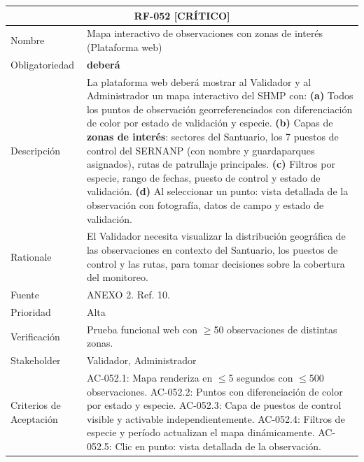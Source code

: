 \documentclass[12pt, a4paper]{article}
\newcommand{\criticomark}{\textcolor{criticolor}{\textbf{[CR\'ITICO]}}}
\begin{document}
\begin{longtable}{|p{3cm}|p{11.5cm}|}
\hline
\multicolumn{2}{|c|}{\textbf{RF-052} \criticomark} \\
\hline
Nombre & Mapa interactivo de observaciones con zonas de inter\'es (Plataforma web) \\
\hline
Obligatoriedad & \textbf{deber\'a} \\
\hline
Descripci\'on & La plataforma web deber\'a mostrar al Validador y al Administrador un mapa interactivo del SHMP con:\newline
\textbf{(a)} Todos los puntos de observaci\'on georreferenciados con diferenciaci\'on de color por estado de validaci\'on y especie.\newline
\textbf{(b)} Capas de \textbf{zonas de inter\'es}: sectores del Santuario, los 7 puestos de control del SERNANP (con nombre y guardaparques asignados), rutas de patrullaje principales.\newline
\textbf{(c)} Filtros por especie, rango de fechas, puesto de control y estado de validaci\'on.\newline
\textbf{(d)} Al seleccionar un punto: vista detallada de la observaci\'on con fotograf\'ia, datos de campo y estado de validaci\'on. \\
\hline
Rationale & El Validador necesita visualizar la distribuci\'on geogr\'afica de las observaciones en contexto del Santuario, los puestos de control y las rutas, para tomar decisiones sobre la cobertura del monitoreo. \\
\hline
Fuente & ANEXO 2. Ref. 10. \\
\hline
Prioridad & Alta \\
\hline
Verificaci\'on & Prueba funcional web con $\geq$50 observaciones de distintas zonas. \\
\hline
Stakeholder & Validador, Administrador \\
\hline
Criterios de Aceptaci\'on &
AC-052.1: Mapa renderiza en $\leq$5 segundos con $\leq$500 observaciones. \newline
AC-052.2: Puntos con diferenciaci\'on de color por estado y especie. \newline
AC-052.3: Capa de puestos de control visible y activable independientemente. \newline
AC-052.4: Filtros de especie y per\'iodo actualizan el mapa din\'amicamente. \newline
AC-052.5: Clic en punto: vista detallada de la observaci\'on. \\
\hline
\end{longtable}
\end{document}
